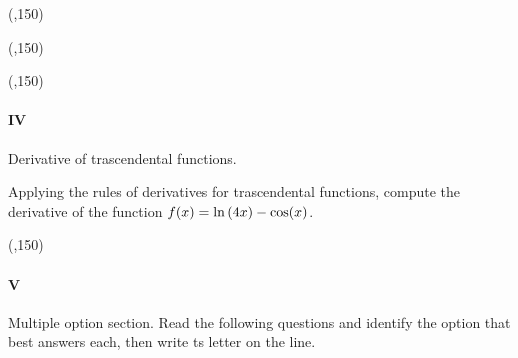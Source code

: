 \begin{preguntas}


\begin{center}
    \framebox(\textwidth,150){} 
\end{center}


\begin{center}
    \framebox(\textwidth,150){} 
\end{center}


\begin{center}
    \framebox(\textwidth,150){} 
\end{center}

\end{preguntas}


\newpage

\paragraph{IV} Derivative of trascendental functions.

\begin{preguntas}

\pregunta[6] Applying the rules of derivatives for trascendental functions, compute the derivative of the function $f(x) = \ln\qty(4x) - \cos(x)$. 

\begin{center}
    \framebox(\textwidth,150){} 
\end{center}

\end{preguntas}

\paragraph{V} Multiple option section. 
Read the following questions and identify the option that best answers each, then write ts letter on the line.

